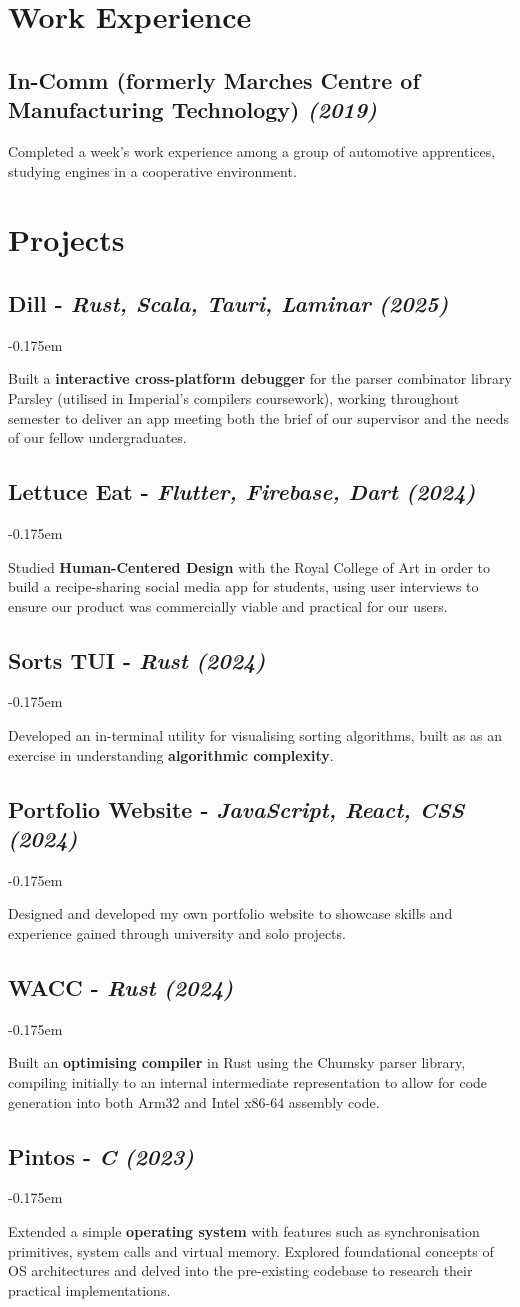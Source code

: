\documentclass{article}
\newcommand{\dates}[1]{\hfill\textit{(#1)}}
\newcommand{\indentsubsection}[2]{
    \subsection*{#1}
    #2
}
\newcommand{\project}[4]{
    \indentsubsection{\textbf{#1} - \textit{#3} \dates{#2}}
    \vspace{-0.175em}
    \begin{minipage}{\dimexpr\textwidth - 2em}
        #4
    \end{minipage}    
    \hfill
    \vspace{-0.15em}
}
\begin{document}
\section*{Work Experience}

\indentsubsection{\textbf{In-Comm} (formerly Marches Centre of Manufacturing Technology) \dates{2019}}{
    \vspace{-0.175em}
    Completed a week's work experience among a group of automotive apprentices, studying engines in a cooperative environment.
}


\section*{Projects}

\project{Dill }{2025}{Rust, Scala, Tauri, Laminar}{
    Built a \textbf{interactive cross-platform debugger} for the parser combinator library Parsley (utilised in Imperial's compilers coursework), 
    working throughout semester to deliver an app meeting both the brief of our supervisor and the needs of our fellow undergraduates.
}

\project{Lettuce Eat }{2024}{Flutter, Firebase, Dart}{
    Studied \textbf{Human-Centered Design} with the Royal College of Art in order to build a recipe-sharing social media app for students,
    using user interviews to ensure our product was commercially viable and practical for our users.
}

\project{Sorts TUI}{2024}{Rust}{
    Developed an in-terminal utility for visualising sorting algorithms, built as as an exercise in understanding \textbf{algorithmic complexity}.
}

\project{Portfolio Website}{2024}{JavaScript, React, CSS}{
    Designed and developed my own portfolio website to showcase skills and experience gained through university and solo projects.
}

\project{WACC }{2024}{Rust}{
    Built an \textbf{optimising compiler} in Rust using the Chumsky parser library, compiling initially to an 
    internal intermediate representation to allow for code generation into both Arm32 and Intel x86-64 assembly code.
}

\project{Pintos }{2023}{C}{
    Extended a simple \textbf{operating system} with features such as synchronisation primitives, 
    system calls and virtual memory. Explored foundational concepts of OS architectures and delved into the
    pre-existing codebase to research their practical implementations. 
}
\end{document}
